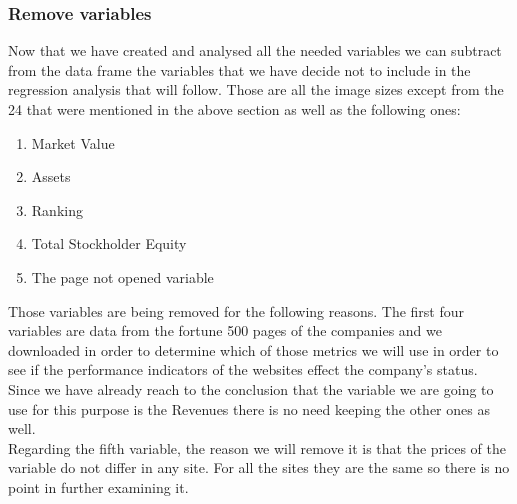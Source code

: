 \documentclass{book}
\begin{document}
\subsubsection{Remove variables}
Now that we have created and analysed all the needed variables we can subtract from the data frame the variables that we have decide not to include in the regression analysis that will follow. Those are all the image sizes except from the 24 that were mentioned in the above section as well as the following ones:
\begin{enumerate}
\item Market Value 
\item Assets
\item Ranking
\item Total Stockholder Equity
\item The page not opened variable
\end{enumerate}
Those variables are being removed for the following reasons. The first four variables are data from the fortune 500 pages of the companies and we downloaded in order to determine which of those metrics we will use in order to see if the performance indicators of the websites effect the company's status. Since we have already reach to the conclusion that the variable we are going to use for this purpose is the Revenues there is no need keeping the other ones as well.\\
Regarding the fifth variable, the reason we will remove it is that the prices of the variable do not differ in any site. For all the sites they are the same so there is no point in further examining it.
\end{document}
